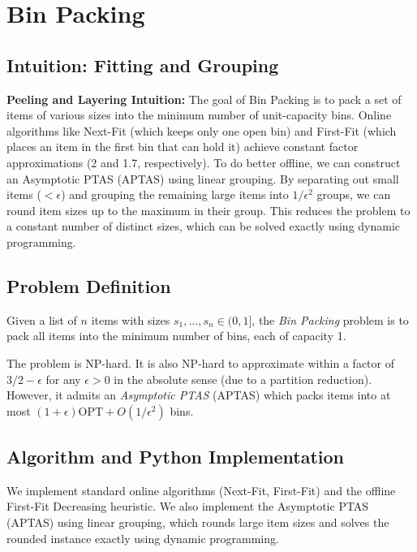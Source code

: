 \chapter{Bin Packing}
\label{ch:bin_packing}

\section{Intuition: Fitting and Grouping}

\begin{intuitionbox}
\textbf{Peeling and Layering Intuition:} The goal of Bin Packing is to pack a set of items of various sizes into the minimum number of unit-capacity bins. Online algorithms like Next-Fit (which keeps only one open bin) and First-Fit (which places an item in the first bin that can hold it) achieve constant factor approximations (2 and 1.7, respectively). To do better offline, we can construct an Asymptotic PTAS (APTAS) using linear grouping. By separating out small items ($<\epsilon$) and grouping the remaining large items into $1/\epsilon^2$ groups, we can round item sizes up to the maximum in their group. This reduces the problem to a constant number of distinct sizes, which can be solved exactly using dynamic programming.
\end{intuitionbox}

\section{Problem Definition}
Given a list of $n$ items with sizes $s_1, \dots, s_n \in (0, 1]$, the \emph{Bin Packing} problem is to pack all items into the minimum number of bins, each of capacity 1.

The problem is NP-hard. It is also NP-hard to approximate within a factor of $3/2 - \epsilon$ for any $\epsilon > 0$ in the absolute sense (due to a partition reduction). However, it admits an \emph{Asymptotic PTAS} (APTAS) which packs items into at most $(1 + \epsilon)\text{OPT} + O(1/\epsilon^2)$ bins.

\section{Algorithm and Python Implementation}
We implement standard online algorithms (Next-Fit, First-Fit) and the offline First-Fit Decreasing heuristic. We also implement the Asymptotic PTAS (APTAS) using linear grouping, which rounds large item sizes and solves the rounded instance exactly using dynamic programming.

